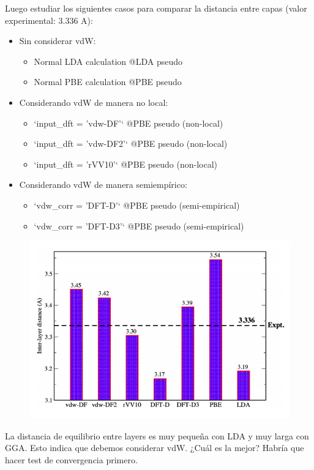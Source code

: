   Luego estudiar los siguientes casos para comparar la distancia entre capas (valor experimental: 3.336 A):
  \begin{itemize}
    \item Sin considerar vdW:
      \begin{itemize}
        \item Normal LDA calculation   @LDA pseudo
        \item Normal PBE calculation   @PBE pseudo
      \end{itemize}
    \item Considerando vdW de manera no local:
      \begin{itemize}
        \item `input_dft = 'vdw-DF'`    @PBE pseudo (non-local)
        \item `input_dft = 'vdw-DF2'`   @PBE pseudo (non-local)
        \item `input_dft = 'rVV10'`     @PBE pseudo (non-local)
      \end{itemize}
    \item Considerando vdW de manera semiempírico:
      \begin{itemize}
        \item `vdw_corr  = 'DFT-D'`     @PBE pseudo (semi-empirical)
        \item `vdw_corr  = 'DFT-D3'`    @PBE pseudo (semi-empirical)
      \end{itemize}
  \end{itemize}


  \begin{figure}[H]
      \centering
      \includegraphics[scale = 0.5]{figs/D4/vdW.png}
  \end{figure}

  La distancia de equilibrio entre layers es muy pequeña con LDA y muy larga con GGA. Esto indica que debemos considerar vdW. ¿Cuál es la mejor? Habría que hacer test de convergencia primero. 
